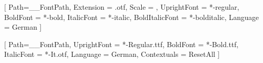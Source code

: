    
    



\fi


\ifJHPreamble@StandardTextFonts
\else
    \ifJHPreamble@GyrePagella
        \setmainfont{texgyrepagella}[
            Path=\__FontPath,
            Extension = .otf,
            Scale = \JHPreamble@GyreScale,
            UprightFont = *-regular,
            BoldFont = *-bold,
            ItalicFont = *-italic,
            BoldItalicFont = *-bolditalic, 
            Language = German
        ]
        
        \setsansfont{Myriad-Pro}[ %
            Path=\__FontPath, 
            UprightFont = *-Regular.ttf,
            BoldFont = *-Bold.ttf, %
            ItalicFont = *-It.otf, %
            Language = German,
            Contextuals = ResetAll
        ]
        

